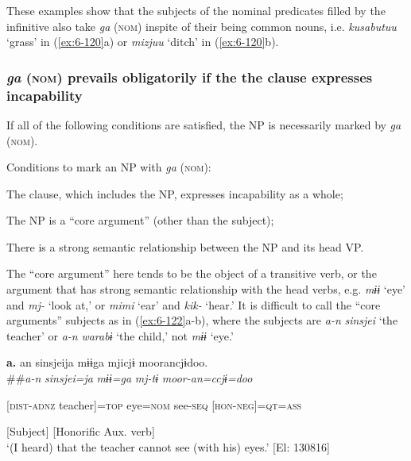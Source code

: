 \begin{table}
These examples show that the subjects of the nominal predicates filled by the infinitive also take \textit{ga} (\textsc{nom}) inspite of their being common nouns, i.e. \textit{kusabutuu} ‘grass’ in (\ref{ex:6-120}a) or \textit{mizjuu} ‘ditch’ in (\ref{ex:6-120}b).

\subsubsection{\textit{ga} (\textsc{nom}) prevails obligatorily if the the clause expresses incapability}

If all of the following conditions are satisfied, the NP is necessarily marked by \textit{ga} (\textsc{nom}).

\begin{styleBeschriftung}
\textmd{\ea\label{ex:6-121}
 Conditions to mark an NP with} \textmd{\textit{ga}}\textmd{ (\textsc{nom}):}


 \ea  The clause, which includes the NP, expresses incapability as a whole;\\
\gll

\ex The NP is a “core argument” (other than the subject);\\
\gll

\ex There is a strong semantic relationship between the NP and its head VP.\\
\gll

The “core argument” here tends to be the object of a transitive verb, or the argument that has strong semantic relationship with the head verbs, e.g. \textit{mɨɨ} ‘eye’ and \textit{mj-} ‘look at,’ or \textit{mimi} ‘ear’ and \textit{kik-} ‘hear.’ It is difficult to call the “core arguments” subjects as in (\ref{ex:6-122}a-b), where the subjects are \textit{a-n} \textit{sinsjei} ‘the teacher’ or \textit{a-n} \textit{warabɨ} ‘the child,’ not \textit{mɨɨ} ‘eye.’

\ea\label{ex:6-122}
 \textbf{a.}  {\TM}  an  sinsjeija  mɨɨga  mjicjɨ  moorancjɨdoo.\\##\textit{a-n}  \textit{sinsjei=ja}  \textit{mɨɨ=ga}  \textit{mj-tɨ}  \textit{moor-an=ccjɨ=doo}

      [\textsc{dist}-\textsc{adnz}  teacher]=\textsc{top}  eye=\textsc{nom}  see-\textsc{seq}  [\textsc{hon}-\textsc{neg}]=\textsc{qt}=\textsc{ass}

      [Subject]      [Honorific Aux. verb]\\
\glt ‘(I heard) that the teacher cannot see (with his) eyes.’ [El: 130816]


\end{styleBeschriftung}
\end{table}
